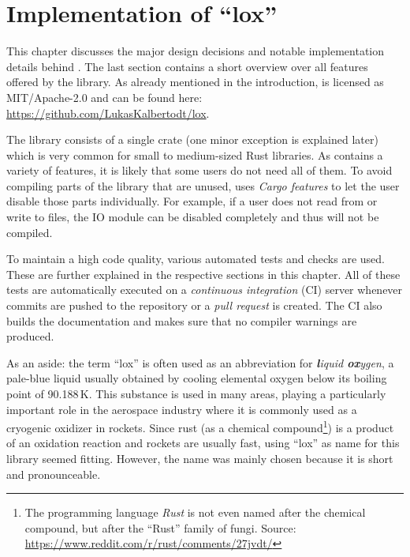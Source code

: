 \chapter{Implementation of \enquote{lox}}

This chapter discusses the major design decisions and notable implementation details behind .
The last section contains a short overview over all features offered by the library. As already mentioned in the introduction,  is licensed as MIT/Apache-2.0 and can be found here: \url{https://github.com/LukasKalbertodt/lox}.

The library consists of a single crate (one minor exception is explained later) which is very common for small to medium-sized Rust libraries.
As  contains a variety of features, it is likely that some users do not need all of them.
To avoid compiling parts of the library that are unused,  uses \emph{Cargo features} to let the user disable those parts individually.
For example, if a user does not read from or write to files, the IO module can be disabled completely and thus will not be compiled.

To maintain a high code quality, various automated tests and checks are used.
These are further explained in the respective sections in this chapter.
All of these tests are automatically executed on a \emph{continuous integration} (CI) server whenever commits are pushed to the repository or a \emph{pull request} is created.
The CI also builds the documentation and makes sure that no compiler warnings are produced.

As an aside:
the term \enquote{lox} is often used as an abbreviation for \emph{\textbf{l}iquid \textbf{ox}ygen}, a pale-blue liquid usually obtained by cooling elemental oxygen below its boiling point of 90.188\,K.
This substance is used in many areas, playing a particularly important role in the aerospace industry where it is commonly used as a cryogenic oxidizer in rockets.
Since rust (as a chemical compound\footnote{The programming language \emph{Rust} is not even named after the chemical compound, but after the \enquote{Rust} family of fungi. Source: \url{https://www.reddit.com/r/rust/comments/27jvdt/}}) is a product of an oxidation reaction and rockets are usually fast, using \enquote{lox} as name for this library seemed fitting.
However, the name was mainly chosen because it is short and pronounceable.


\newpage


\newpage


\newpage


\newpage


\newpage


